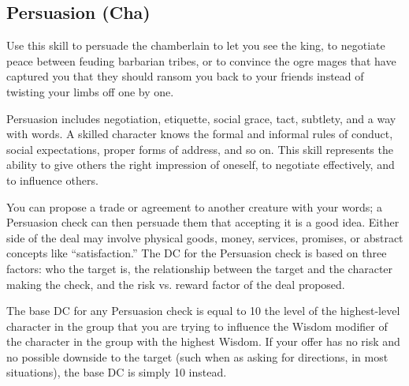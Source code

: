 \subsection{Persuasion (Cha)}
Use this skill to persuade the chamberlain to let you see the king, to negotiate peace between feuding barbarian tribes, or to convince the ogre mages that have captured you that they should ransom you back to your friends instead of twisting your limbs off one by one.

Persuasion includes negotiation, etiquette, social grace, tact, subtlety, and a way with words. A skilled character knows the formal and informal rules of conduct, social expectations, proper forms of address, and so on. This skill represents the ability to give others the right impression of oneself, to negotiate effectively, and to influence others.

 You can propose a trade or agreement to another creature with your words; a Persuasion check can then persuade them that accepting it is a good idea. Either side of the deal may involve physical goods, money, services, promises, or abstract concepts like ``satisfaction.'' The DC for the Persuasion check is based on three factors: who the target is, the relationship between the target and the character making the check, and the risk vs. reward factor of the deal proposed.

\par The base DC for any Persuasion check is equal to 10 \add the level of the highest-level character in the group that you are trying to influence \add the Wisdom modifier of the character in the group with the highest Wisdom. If your offer has no risk and no possible downside to the target (such when as asking for directions, in most situations), the base DC is simply 10 instead.

